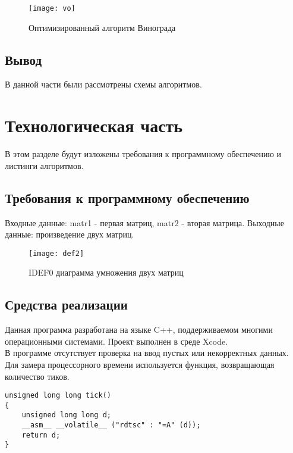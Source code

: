 \documentclass[a4paper, 14pt]{article}
\begin{document}
	\begin{figure}[H]
        	\begin{center}
        		{\texttt{[image: vo]}}
        		\caption{Оптимизированный алгоритм Винограда}
        	\end{center}
        \end{figure}
	
	\subsection{Вывод}
	
	В данной части были рассмотрены схемы алгоритмов.

	\newpage
	\section{Технологическая часть}
	
	В этом разделе будут изложены требования к программному обеспечению и листинги алгоритмов.
	
	\subsection{Требования к программному обеспечению}
	Входные данные: matr1 - первая матриц, matr2 - вторая матрица.
	Выходные данные: произведение двух матриц.

	\begin{figure}[H]
        	\begin{center}
        		{\texttt{[image: def2]}}
        		\caption{IDEF0 диаграмма умножения двух матриц}
        	\end{center}
        \end{figure}
	
	\subsection{Средства реализации}
	
		Данная программа разработана на языке C++, поддерживаемом многими операционными системами. Проект выполнен в среде Xcode. \\
		
		В программе отсутствует проверка на ввод пустых или некорректных данных.\\
	
	Для замера процессорного времени используется функция, возвращающая количество тиков.
	
	\newpage
	\begin{lstlisting}[label=some-code,caption=Функция замера количества тиков]
unsigned long long tick()
{
    unsigned long long d;
    __asm__ __volatile__ ("rdtsc" : "=A" (d));
    return d;
}
\end{lstlisting}
\end{document}
